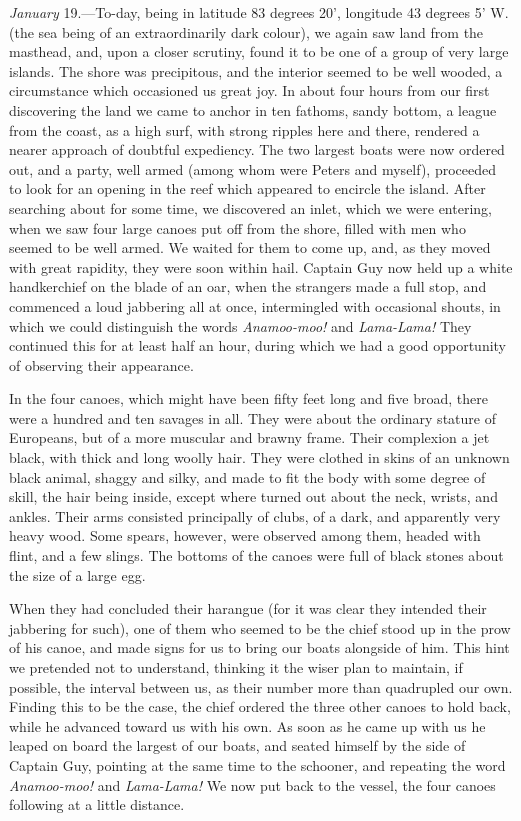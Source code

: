 \emph{January} 19.---To-day, being in latitude 83 degrees 20', longitude 43
degrees 5' W. (the sea being of an extraordinarily dark colour), we again saw
land from the masthead, and, upon a closer scrutiny, found it to be one of a
group of very large islands. The shore was precipitous, and the interior seemed
to be well wooded, a circumstance which occasioned us great joy. In about four
hours from our first discovering the land we came to anchor in ten fathoms,
sandy bottom, a league from the coast, as a high surf, with strong ripples here
and there, rendered a nearer approach of doubtful expediency. The two largest
boats were now ordered out, and a party, well armed (among whom were Peters and
myself), proceeded to look for an opening in the reef which appeared to encircle
the island. After searching about for some time, we discovered an inlet, which
we were entering, when we saw four large canoes put off from the shore, filled
with men who seemed to be well armed. We waited for them to come up, and, as
they moved with great rapidity, they were soon within hail. Captain Guy now held
up a white handkerchief on the blade of an oar, when the strangers made a full
stop, and commenced a loud jabbering all at once, intermingled with occasional
shouts, in which we could distinguish the words \emph{Anamoo-moo!} and
\emph{Lama-Lama!} They continued this for at least half an hour, during which we
had a good opportunity of observing their appearance. 

In the four canoes, which might have been fifty feet long and five broad,
there were a hundred and ten savages in all. They were about the ordinary
stature of Europeans, but of a more muscular and brawny frame. Their complexion
a jet black, with thick and long woolly hair. They were clothed in skins of an
unknown black animal, shaggy and silky, and made to fit the body with some
degree of skill, the hair being inside, except where turned out about the neck,
wrists, and ankles. Their arms consisted principally of clubs, of a dark, and
apparently very heavy wood. Some spears, however, were observed among them,
headed with flint, and a few slings. The bottoms of the canoes were full of
black stones about the size of a large egg. 

When they had concluded their harangue (for it was clear they intended their
jabbering for such), one of them who seemed to be the chief stood up in the prow
of his canoe, and made signs for us to bring our boats alongside of him. This
hint we pretended not to understand, thinking it the wiser plan to maintain, if
possible, the interval between us, as their number more than quadrupled our own.
Finding this to be the case, the chief ordered the three other canoes to hold
back, while he advanced toward us with his own. As soon as he came up with us he
leaped on board the largest of our boats, and seated himself by the side of
Captain Guy, pointing at the same time to the schooner, and repeating the word
\emph{Anamoo-moo!} and \emph{Lama-Lama!} We now put back to the vessel, the four
canoes following at a little distance. 

